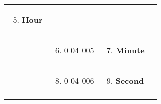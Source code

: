 \begin{longtable}[]{@{}llll@{}}
\begin{minipage}[t]{0.22\columnwidth}
\begin{enumerate}
\setcounter{enumi}{4}
\item
  \textbf{Hour}
\end{enumerate}\strut
\end{minipage} & \begin{minipage}[t]{0.22\columnwidth}\raggedright
\strut
\end{minipage}\tabularnewline
\begin{minipage}[t]{0.22\columnwidth}\raggedright
\strut
\end{minipage} & \begin{minipage}[t]{0.22\columnwidth}\raggedright
\begin{enumerate}
\setcounter{enumi}{5}
\item
  0 04 005
\end{enumerate}\strut
\end{minipage} & \begin{minipage}[t]{0.22\columnwidth}\raggedright
\begin{enumerate}
\setcounter{enumi}{6}
\item
  \textbf{Minute}
\end{enumerate}\strut
\end{minipage} & \begin{minipage}[t]{0.22\columnwidth}\raggedright
\strut
\end{minipage}\tabularnewline
\begin{minipage}[t]{0.22\columnwidth}\raggedright
\strut
\end{minipage} & \begin{minipage}[t]{0.22\columnwidth}\raggedright
\begin{enumerate}
\setcounter{enumi}{7}
\item
  0 04 006
\end{enumerate}\strut
\end{minipage} & \begin{minipage}[t]{0.22\columnwidth}\raggedright
\begin{enumerate}
\setcounter{enumi}{8}
\item
  \textbf{Second}
\end{enumerate}\strut
\end{minipage} & \begin{minipage}[t]{0.22\columnwidth}\raggedright
\strut
\end{minipage}\tabularnewline
\begin{minipage}[t]{0.22\columnwidth}\raggedright
\strut
\end{minipage} & \begin{minipage}[t]{0.22\columnwidth}\raggedright

\end{minipage}
\end{longtable}
